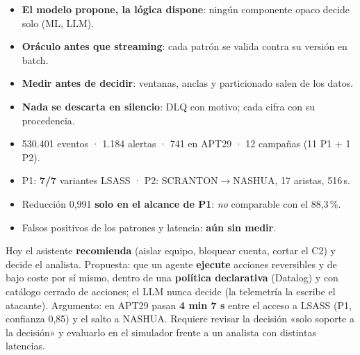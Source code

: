 \documentclass[9pt,a4paper]{extarticle}
\newcommand{\fl}{$\rightarrow$}
\begin{document}
\vspace{0.4em}
\begin{multicols}{2}
\begin{tcolorbox}[enhanced,colback=fondo,colframe=gris,boxrule=0.5pt,arc=1.5pt,left=4pt,right=4pt,top=2pt,bottom=2pt,fonttitle=\bfseries\small,title=Principios de diseño]
\small
\begin{itemize}
  \item \textbf{El modelo propone, la lógica dispone}: ningún componente opaco decide solo (ML, LLM).
  \item \textbf{Oráculo antes que streaming}: cada patrón se valida contra su versión en batch.
  \item \textbf{Medir antes de decidir}: ventanas, anclas y particionado salen de los datos.
  \item \textbf{Nada se descarta en silencio}: DLQ con motivo; cada cifra con su procedencia.
\end{itemize}
\end{tcolorbox}
\columnbreak
\begin{tcolorbox}[enhanced,colback=fondo,colframe=rojo,boxrule=0.5pt,arc=1.5pt,left=4pt,right=4pt,top=2pt,bottom=2pt,fonttitle=\bfseries\small,title=Cifras para tener a mano]
\small
\begin{itemize}
  \item 530.401 eventos · 1.184 alertas · 741 en APT29 · 12 campañas (11 P1 + 1 P2).
  \item P1: \textbf{7/7} variantes LSASS · P2: SCRANTON\fl NASHUA, 17 aristas, 516\,s.
  \item Reducción 0,991 \textbf{solo en el alcance de P1}: \textit{no} comparable con el 88,3\,\%.
  \item Falsos positivos de los patrones y latencia: \textbf{aún sin medir}.
\end{itemize}
\end{tcolorbox}
\end{multicols}
\begin{tcolorbox}[enhanced,colback=violeta!6,colframe=violeta,boxrule=0.5pt,arc=1.5pt,left=4pt,right=4pt,top=2pt,bottom=2pt,fonttitle=\bfseries\small,title=Propuesta para hablar: agente de respuesta autónoma acotada (F6.4)]
\small
Hoy el asistente \textbf{recomienda} (aislar equipo, bloquear cuenta, cortar el C2) y decide el analista. Propuesta: que un agente
\textbf{ejecute} acciones reversibles y de bajo coste por sí mismo, dentro de una \textbf{política declarativa} (Datalog) y con
catálogo cerrado de acciones; el LLM nunca decide (la telemetría la escribe el atacante). Argumento: en APT29 pasan
\textbf{4 min 7 s} entre el acceso a LSASS (P1, confianza 0,85) y el salto a NASHUA. Requiere revisar la decisión
«solo soporte a la decisión» y evaluarlo en el simulador frente a un analista con distintas latencias.
\end{tcolorbox}
\end{document}
